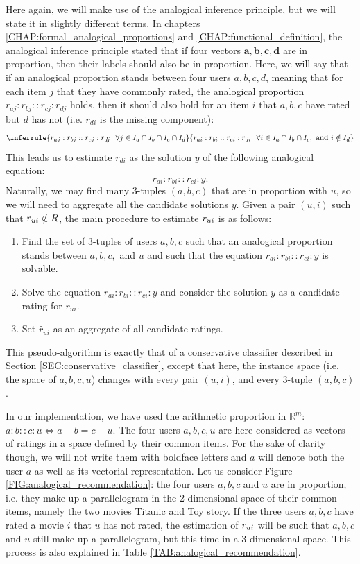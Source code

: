 Here again, we will make use of the analogical inference principle, but we will
state it in slightly different terms. In chapters
\ref{CHAP:formal_analogical_proportions} and \ref{CHAP:functional_definition},
the analogical inference principle stated that if four vectors $\mathbf{a},
\mathbf{b}, \mathbf{c}, \mathbf{d}$ are in proportion, then their labels should
also be in proportion.  Here, we will say that if an analogical proportion
stands between four users $a, b, c, d$, meaning that for each item $j$ that
they have commonly rated, the analogical proportion $r_{aj} : r_{bj} :: r_{cj}
: r_{dj}$ holds, then it should also hold for an item $i$ that $a, b, c$ have
rated but $d$ has not (i.e. $r_{di}$ is the missing component):
$$
\inferrule{r_{aj} : r_{bj} :: r_{cj} : r_{dj} ~~ \forall j \in
I_a \cap I_b \cap I_c \cap  I_d}
{r_{ai} : r_{bi} :: r_{ci} : r_{di} ~~ \forall i \in I_a \cap I_b \cap I_c,
\text{ and } i\notin I_d }
$$
This leads us to estimate $r_{di}$ as the solution $y$ of the following
analogical equation:
$$r_{ai} : r_{bi} :: r_{ci} : y.$$
Naturally, we may find many $3$-tuples $(a, b, c)$ that are in proportion with
$u$, so we will need  to aggregate all the candidate solutions $y$.  Given a
pair $(u,i)$ such that $r_{ui} \notin R$, the main procedure to estimate $r_{ui}$
is as follows:
\begin{enumerate}
\item Find the set of 3-tuples of users $a, b, c$ such that an analogical
  proportion stands between $a, b, c,$ and $u$ and such that the equation
    $r_{ai} : r_{bi} :: r_{ci} : y$ is solvable.
\item Solve the equation $r_{ai} : r_{bi} :: r_{ci} : y$ and consider the
  solution $y$ as a candidate rating for $r_{ui}$.
\item Set $\hat{r}_{ui}$ as an aggregate of all candidate ratings.
\end{enumerate}

This pseudo-algorithm is exactly that of a conservative classifier described in
Section \ref{SEC:conservative_classifier}, except that here, the instance space
(i.e. the space of $a, b, c, u$) changes with every pair $(u, i)$, and every
$3$-tuple $(a, b, c)$.

In our implementation, we have used the arithmetic proportion in
$\mathbb{R}^m$: $a:b::c:u \iff a - b = c - u$.  The four users $a, b, c, u$ are
here considered as vectors of ratings in a space defined by their common items.
For the sake of clarity though, we will not write them with boldface letters
and $a$ will denote both the user $a$ as well as its vectorial representation.
Let us consider Figure \ref{FIG:analogical_recommendation}: the four users $a,
b, c$ and $u$ are in proportion, i.e. they make up a parallelogram in the
2-dimensional space of their common items, namely the two movies Titanic and Toy story. If the
three users $a, b, c$ have rated a movie $i$ that $u$ has not rated, the
estimation of $r_{ui}$ will be such that $a, b, c$ and $u$ still make up a
parallelogram, but this time in a 3-dimensional space. This process is also
explained in Table \ref{TAB:analogical_recommendation}.


